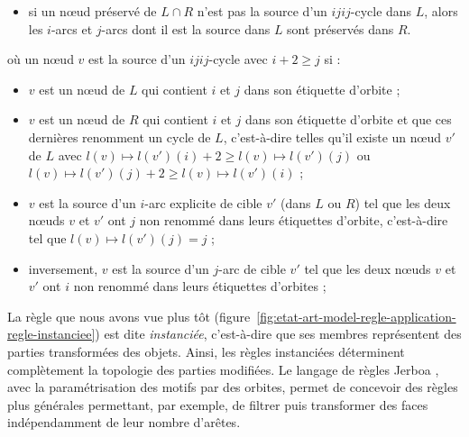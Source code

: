 \begin{theoreme}
\begin{itemize}
\begin{itemize}
			            $L$, alors il est la source d'un $ijij$-cycle dans $R$ ;
			      \item si un n\oe ud préservé de $L \cap R$ n'est pas la source d'un $ijij$-cycle
			            dans $L$, alors les $i$-arcs et $j$-arcs dont il est la source dans $L$ sont
			            préservés dans $R$.
		      \end{itemize}
		      \vspace{3pt}
		      où un n\oe ud $v$ est la source d'un $ijij$-cycle avec $i+2 \geq j$ si :
		      \begin{itemize}
			      \item $v$ est un n\oe ud de $L$ qui contient $i$ et $j$ dans son
			            étiquette d'orbite ;
			      \item $v$ est un n\oe ud de $R$ qui contient $i$ et $j$ dans son
			            étiquette d'orbite et que ces dernières renomment un cycle
			            de $L$, c'est-à-dire telles qu'il existe un n\oe ud $v'$ de $L$
			            avec $l(v) \mapsto l(v') (i) +2 \geq l(v) \mapsto l(v') (j)$ ou
			            $l(v) \mapsto l(v') (j) +2 \geq l(v) \mapsto l(v') (i)$ ;
			      \item $v$ est la source d'un $i$-arc explicite de cible $v'$ (dans $L$ ou
			            $R$) tel que les deux n\oe uds $v$ et $v'$ ont $j$  non renommé dans leurs
			            étiquettes d'orbite, c'est-à-dire tel que
			            $l(v) \mapsto l(v') (j) = j$ ;
			      \item inversement, $v$ est la source d'un $j$-arc de cible $v'$
			            tel que les deux n\oe uds $v$ et $v'$ ont $i$ non renommé dans leurs
			            étiquettes d'orbites ;
		      \end{itemize}
	\end{itemize}
\end{theoreme}

La règle que nous avons vue plus tôt
(figure~\ref{fig:etat-art-model-regle-application-regle-instanciee}) est dite
\emph{instanciée}, c'est-à-dire que ses membres représentent des parties transformées des objets.
Ainsi, les règles instanciées déterminent complètement la topologie des parties
modifiées. %
Le langage de règles Jerboa \cite{belhaouari2014jerboa}, avec la paramétrisation
des motifs par des orbites, permet de concevoir des règles plus générales
permettant, par exemple, de filtrer puis transformer des faces indépendamment de
leur nombre d'arêtes. %

